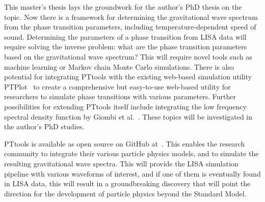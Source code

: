 This master's thesis lays the groundwork for the author's PhD thesis on the topic.
Now there is a framework for determining the gravitational wave spectrum from the phase transition parameters,
including temperature-dependent speed of sound.
Determining the parameters of a phase transition from LISA data will require solving the inverse problem:
what are the phase transition parameters based on the gravitational wave spectrum?
This will require novel tools such as machine learning or Markov chain Monte Carlo simulations.
There is also potential for integrating PTtools with the existing web-based simulation utility
PTPlot~\cites{ptplot}{hindmarsh_shape_2017}{caprini_detecting_2020}
to create a comprehensive but easy-to-use web-based utility for researchers to simulate phase transitions with various parameters.
Further possibilities for extending PTtools itself include integrating
the low frequency spectral density function by Giombi et al.~\cite[eq. 3.6]{giombi_cs_2024}.
These topics will be investigated in the author's PhD studies.

PTtools is available as open source on GitHub at~\cite{pttools}.
This enables the research community to integrate their various particle physics models,
and to simulate the resulting gravitational wave spectra.
This will provide the LISA simulation pipeline with various waveforms of interest,
and if one of them is eventually found in LISA data,
this will result in a groundbreaking discovery
that will point the direction for the development of particle physics beyond the Standard Model.
